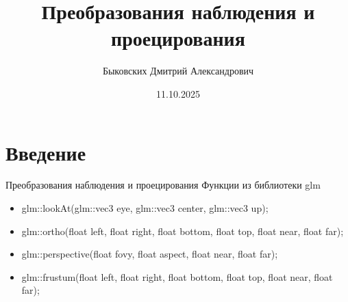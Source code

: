 \documentclass{beamer}
\title[Наблюдение и проецирование]{Преобразования наблюдения и проецирования}
\author[Быковских Д.А.]{Быковских Дмитрий Александрович}
\date{11.10.2025}
\begin{document}
	\begin{frame}
		\titlepage
	\end{frame}

	\section{Введение}

	\begin{frame}{Преобразования наблюдения и проецирования}
		Функции из библиотеки glm
		\begin{itemize}
			\item glm::lookAt(glm::vec3 eye, glm::vec3 center, glm::vec3 up);
			\item glm::ortho(float left, float right, float bottom, float top, float near, float far);
			\item glm::perspective(float fovy, float aspect, float near, float far);
			\item glm::frustum(float left, float right, float bottom, float top, float near, float far);
		\end{itemize}
	\end{frame}
\end{document}

